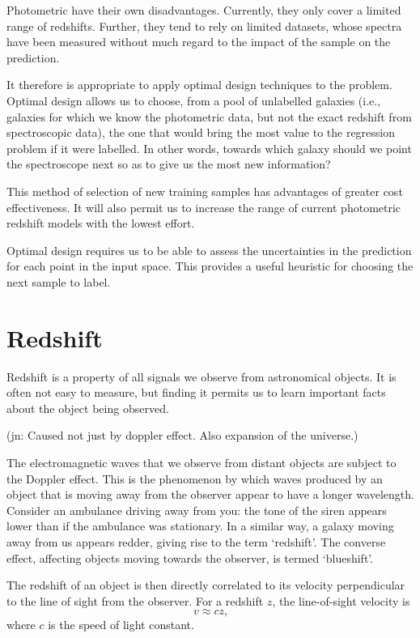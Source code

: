 \documentclass[11pt,twoside]{report}
\newcommand\jn[1]{{\color{red}(jn: #1)}}
\begin{document}
Photometric have their own disadvantages. Currently, they only cover a limited range of redshifts. Further, they tend to rely on limited datasets, whose spectra have been measured without much regard to the impact of the sample on the prediction.

It therefore is appropriate to apply optimal design techniques to the problem. Optimal design allows us to choose, from a pool of unlabelled galaxies (i.e., galaxies for which we know the photometric data, but not the exact redshift from spectroscopic data), the one that would bring the most value to the regression problem if it were labelled. In other words, towards which galaxy should we point the spectroscope next so as to give us the most new information?

This method of selection of new training samples has advantages of greater cost effectiveness. It will also permit us to increase the range of current photometric redshift models with the lowest effort.

Optimal design requires us to be able to assess the uncertainties in the prediction for each point in the input space. This provides a useful heuristic for choosing the next sample to label.

\section{Redshift}
  Redshift is a property of all signals we observe from astronomical objects. It is often not easy to measure, but finding it permits us to learn important facts about the object being observed.

  \jn{Caused not just by doppler effect. Also expansion of the universe.}

  The electromagnetic waves that we observe from distant objects are subject to the Doppler effect. This is the phenomenon by which waves produced by an object that is moving away from the observer appear to have a longer wavelength. Consider an ambulance driving away from you: the tone of the siren appears lower than if the ambulance was stationary. In a similar way, a galaxy moving away from us appears redder, giving rise to the term `redshift'. The converse effect, affecting objects moving towards the observer, is termed `blueshift'.

  The redshift of an object is then directly correlated to its velocity perpendicular to the line of sight from the observer. For a redshift $z$, the line-of-sight velocity is\[
      v \approx cz \text{,}
  \] where $c$ is the speed of light constant.
\end{document}
